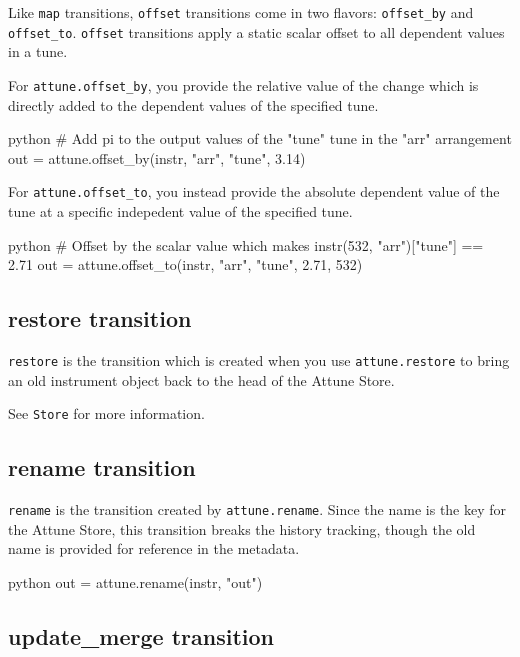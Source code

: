 Like \texttt{map} transitions, \texttt{offset} transitions come in two
flavors: \texttt{offset\_by} and \texttt{offset\_to}.
\texttt{offset} transitions apply a static scalar offset to all
dependent values in a tune.

For \texttt{attune.offset\_by}, you provide the relative value of the
change which is directly added to the dependent values of the specified
tune.

\begin{codefragment}{python}
# Add pi to the output values of the "tune" tune in the "arr" arrangement
out = attune.offset_by(instr, "arr", "tune", 3.14)
\end{codefragment}

For \texttt{attune.offset\_to}, you instead provide the absolute
dependent value of the tune at a specific indepedent value of the
specified tune.

\begin{codefragment}{python}
# Offset by the scalar value which makes instr(532, "arr")["tune"] == 2.71
out = attune.offset_to(instr, "arr", "tune", 2.71, 532)
\end{codefragment}

\hypertarget{restore-transition}{%
\subsection{restore transition}\label{restore-transition}}

\texttt{restore} is the transition which is created when you use
\texttt{attune.restore} to bring an old instrument object back to the
head of the Attune Store.

See \texttt{Store} for more information.

\hypertarget{rename-transition}{%
\subsection{rename transition}\label{rename-transition}}

\texttt{rename} is the transition created by \texttt{attune.rename}.
Since the name is the key for the Attune Store, this transition breaks
the history tracking, though the old name is provided for reference in
the metadata.

\begin{codefragment}{python}
out = attune.rename(instr, "out")
\end{codefragment}

\hypertarget{update_merge-transition}{%
\subsection{update\_merge transition}\label{update_merge-transition}}

